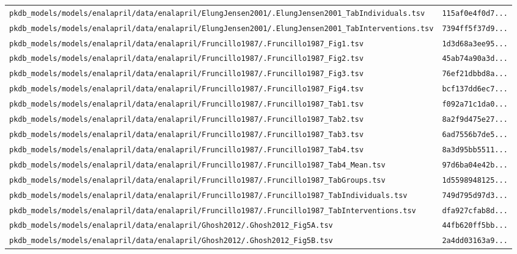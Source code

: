 \begin{longtable}{ll}
\texttt{pkdb\_models/models/enalapril/data/enalapril/ElungJensen2001/.ElungJensen2001\_TabIndividuals.tsv} & \texttt{115af0e4f0d7...} \\
\texttt{pkdb\_models/models/enalapril/data/enalapril/ElungJensen2001/.ElungJensen2001\_TabInterventions.tsv} & \texttt{7394ff5f37d9...} \\
\texttt{pkdb\_models/models/enalapril/data/enalapril/Fruncillo1987/.Fruncillo1987\_Fig1.tsv} & \texttt{1d3d68a3ee95...} \\
\texttt{pkdb\_models/models/enalapril/data/enalapril/Fruncillo1987/.Fruncillo1987\_Fig2.tsv} & \texttt{45ab74a90a3d...} \\
\texttt{pkdb\_models/models/enalapril/data/enalapril/Fruncillo1987/.Fruncillo1987\_Fig3.tsv} & \texttt{76ef21dbbd8a...} \\
\texttt{pkdb\_models/models/enalapril/data/enalapril/Fruncillo1987/.Fruncillo1987\_Fig4.tsv} & \texttt{bcf137dd6ec7...} \\
\texttt{pkdb\_models/models/enalapril/data/enalapril/Fruncillo1987/.Fruncillo1987\_Tab1.tsv} & \texttt{f092a71c1da0...} \\
\texttt{pkdb\_models/models/enalapril/data/enalapril/Fruncillo1987/.Fruncillo1987\_Tab2.tsv} & \texttt{8a2f9d475e27...} \\
\texttt{pkdb\_models/models/enalapril/data/enalapril/Fruncillo1987/.Fruncillo1987\_Tab3.tsv} & \texttt{6ad7556b7de5...} \\
\texttt{pkdb\_models/models/enalapril/data/enalapril/Fruncillo1987/.Fruncillo1987\_Tab4.tsv} & \texttt{8a3d95bb5511...} \\
\texttt{pkdb\_models/models/enalapril/data/enalapril/Fruncillo1987/.Fruncillo1987\_Tab4\_Mean.tsv} & \texttt{97d6ba04e42b...} \\
\texttt{pkdb\_models/models/enalapril/data/enalapril/Fruncillo1987/.Fruncillo1987\_TabGroups.tsv} & \texttt{1d5598948125...} \\
\texttt{pkdb\_models/models/enalapril/data/enalapril/Fruncillo1987/.Fruncillo1987\_TabIndividuals.tsv} & \texttt{749d795d97d3...} \\
\texttt{pkdb\_models/models/enalapril/data/enalapril/Fruncillo1987/.Fruncillo1987\_TabInterventions.tsv} & \texttt{dfa927cfab8d...} \\
\texttt{pkdb\_models/models/enalapril/data/enalapril/Ghosh2012/.Ghosh2012\_Fig5A.tsv} & \texttt{44fb620ff5bb...} \\
\texttt{pkdb\_models/models/enalapril/data/enalapril/Ghosh2012/.Ghosh2012\_Fig5B.tsv} & \texttt{2a4dd03163a9...} \\

\end{longtable}
